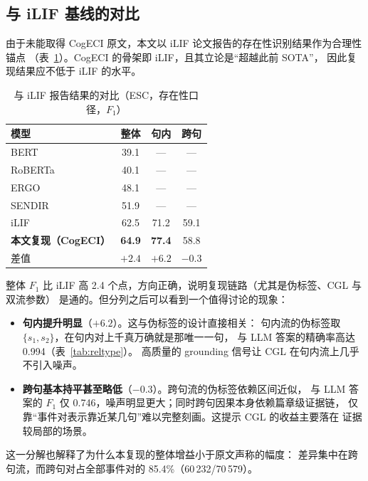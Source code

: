 \subsection{与 iLIF 基线的对比}

由于未能取得 CogECI 原文，本文以 iLIF 论文报告的存在性识别结果作为合理性锚点
（表~\ref{tab:vs}）。CogECI 的骨架即 iLIF，且其立论是“超越此前 SOTA”，
因此复现结果应不低于 iLIF 的水平。

\begin{table}[H]
\centering
\caption{与 iLIF 报告结果的对比（ESC，存在性口径，$F_1$）}
\label{tab:vs}
\small
\begin{tabular}{lccc}
\toprule
模型 & 整体 & 句内 & 跨句\\
\midrule
BERT~\cite{bert}       & 39.1 & --- & ---\\
RoBERTa~\cite{roberta} & 40.1 & --- & ---\\
ERGO~\cite{ergo}       & 48.1 & --- & ---\\
SENDIR~\cite{sendir}   & 51.9 & --- & ---\\
iLIF~\cite{ilif}       & 62.5 & 71.2 & 59.1\\
\midrule
\textbf{本文复现（CogECI）} & \textbf{64.9} & \textbf{77.4} & 58.8\\
差值 & $+2.4$ & $+6.2$ & $-0.3$\\
\bottomrule
\end{tabular}
\end{table}

整体 $F_1$ 比 iLIF 高 2.4 个点，方向正确，说明复现链路（尤其是伪标签、CGL 与双流参数）
是通的。但分列之后可以看到一个值得讨论的现象：

\begin{itemize}
  \item \textbf{句内提升明显}（$+6.2$）。这与伪标签的设计直接相关：
        句内流的伪标签取 $\{s_1,s_2\}$，在句内对上千真万确就是那唯一一句，
        与 LLM 答案的精确率高达 0.994（表~\ref{tab:reltype}）。
        高质量的 grounding 信号让 CGL 在句内流上几乎不引入噪声。
  \item \textbf{跨句基本持平甚至略低}（$-0.3$）。跨句流的伪标签依赖区间近似，
        与 LLM 答案的 $F_1$ 仅 0.746，噪声明显更大；同时跨句因果本身依赖篇章级证据链，
        仅靠“事件对表示靠近某几句”难以完整刻画。这提示 CGL 的收益主要落在
        证据较局部的场景。
\end{itemize}

这一分解也解释了为什么本复现的整体增益小于原文声称的幅度：
差异集中在跨句流，而跨句对占全部事件对的 85.4\%（60\,232/70\,579）。

